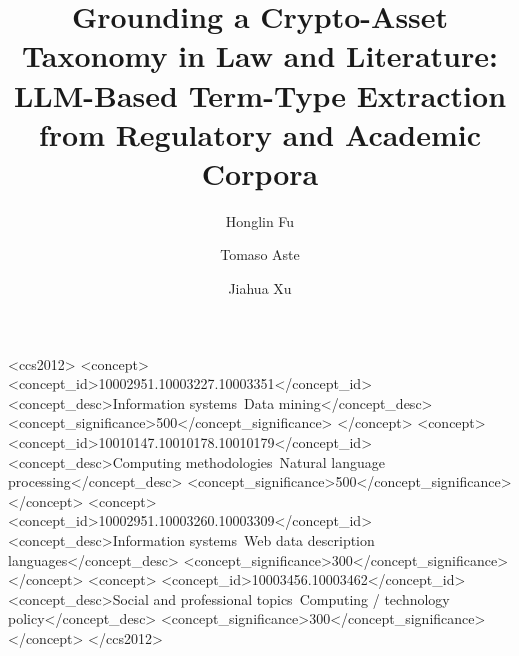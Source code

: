 \documentclass[sigconf]{acmart}
\begin{document}
\title[LLM-Grounded Crypto-Asset Taxonomy]{Grounding a Crypto-Asset Taxonomy in Law and Literature:\\
LLM-Based Term-Type Extraction from Regulatory and Academic Corpora}

\author{Honglin Fu}

\author{Tomaso Aste}

\author{Jiahua Xu}

\renewcommand{\shortauthors}{Fu et al.}

\begin{abstract}

\end{abstract}

\begin{CCSXML}
<ccs2012>
   <concept>
       <concept_id>10002951.10003227.10003351</concept_id>
       <concept_desc>Information systems~Data mining</concept_desc>
       <concept_significance>500</concept_significance>
   </concept>
   <concept>
       <concept_id>10010147.10010178.10010179</concept_id>
       <concept_desc>Computing methodologies~Natural language processing</concept_desc>
       <concept_significance>500</concept_significance>
   </concept>
   <concept>
       <concept_id>10002951.10003260.10003309</concept_id>
       <concept_desc>Information systems~Web data description languages</concept_desc>
       <concept_significance>300</concept_significance>
   </concept>
   <concept>
       <concept_id>10003456.10003462</concept_id>
       <concept_desc>Social and professional topics~Computing / technology policy</concept_desc>
       <concept_significance>300</concept_significance>
   </concept>
</ccs2012>
\end{CCSXML}
\end{document}
